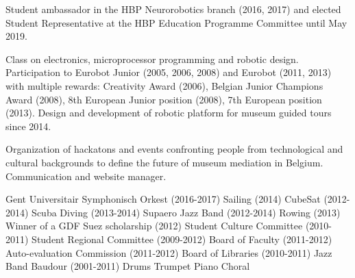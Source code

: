 \documentclass[a4paper]{deedy-resume} %
\begin{document}
Student ambassador in the HBP Neurorobotics branch (2016, 2017) and elected Student Representative at the HBP Education Programme Committee until May 2019.

\vspace{12pt}


Class on electronics, microprocessor programming and robotic design. Participation to Eurobot Junior (2005, 2006, 2008) and Eurobot (2011, 2013) with multiple rewards: Creativity Award (2006), Belgian Junior Champions Award (2008), 8th European Junior position (2008), 7th European position (2013). Design and development of robotic platform for museum guided tours since 2014.

\vspace{12pt}


Organization of hackatons and events confronting people from technological and cultural backgrounds to define the future of museum mediation in Belgium. Communication and website manager.

\vspace{12pt}


\location{}
\vspace{3pt}
Gent Universitair Symphonisch Orkest (2016-2017) \textbullet{} Sailing (2014) \textbullet{} CubeSat (2012-2014) \textbullet{} Scuba Diving (2013-2014) \textbullet{} Supaero Jazz Band (2012-2014) \textbullet{} Rowing (2013) \textbullet{} Winner of a GDF Suez scholarship (2012) \textbullet{}  Student Culture Committee (2010-2011) \textbullet{} Student Regional Committee (2009-2012) \textbullet{} Board of Faculty (2011-2012)  \textbullet{} Auto-evaluation Commission (2011-2012) \textbullet{} Board of Libraries (2010-2011) \textbullet{} Jazz Band Baudour (2001-2011) \textbullet{} Drums \textbullet{} Trumpet \textbullet{} Piano \textbullet{} Choral


\sectionspace %
\vspace{10pt}
\end{document}
